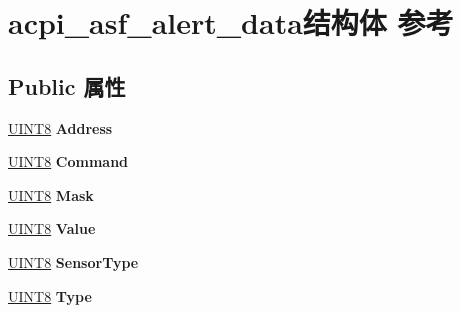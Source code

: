 \hypertarget{structacpi__asf__alert__data}{}\section{acpi\+\_\+asf\+\_\+alert\+\_\+data结构体 参考}
\label{structacpi__asf__alert__data}
\subsection*{Public 属性}
\begin{DoxyCompactItemize}
\item 
\mbox{\label{structacpi__asf__alert__data_a646e3eb9b949e7bcd240ff06146981b3}} 
\hyperlink{_processor_bind_8h_ab27e9918b538ce9d8ca692479b375b6a}{U\+I\+N\+T8} {\bfseries Address}
\item 
\mbox{\label{structacpi__asf__alert__data_a6f303d916099a5000b8afc0c63bcf18c}} 
\hyperlink{_processor_bind_8h_ab27e9918b538ce9d8ca692479b375b6a}{U\+I\+N\+T8} {\bfseries Command}
\item 
\mbox{\label{structacpi__asf__alert__data_ac6eaa019604de5c7a34149d50716b021}} 
\hyperlink{_processor_bind_8h_ab27e9918b538ce9d8ca692479b375b6a}{U\+I\+N\+T8} {\bfseries Mask}
\item 
\mbox{\label{structacpi__asf__alert__data_a0b548cc335bb77b08e468477a8e31a66}} 
\hyperlink{_processor_bind_8h_ab27e9918b538ce9d8ca692479b375b6a}{U\+I\+N\+T8} {\bfseries Value}
\item 
\mbox{\label{structacpi__asf__alert__data_aef9abed2abff178b66ea240a07b82144}} 
\hyperlink{_processor_bind_8h_ab27e9918b538ce9d8ca692479b375b6a}{U\+I\+N\+T8} {\bfseries Sensor\+Type}
\item 
\mbox{\label{structacpi__asf__alert__data_adbfc91b3caf31c1e321d95c094429fd1}} 
\hyperlink{_processor_bind_8h_ab27e9918b538ce9d8ca692479b375b6a}{U\+I\+N\+T8} {\bfseries Type}
\item 
\mbox{\label{structacpi__asf__alert__data_a0302948e63aad6560e4cb349d273387b}} 

\end{DoxyCompactItemize}
